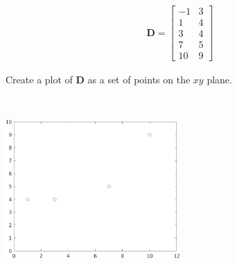 \begin{align*}
    \boldsymbol{D} = \begin{bmatrix}
        -1 & 3 \\
        1 & 4 \\
        3 & 4 \\
        7 & 5 \\
        10 & 9
    \end{bmatrix}
\end{align*}

Create a plot of $\boldsymbol{D}$ as a set of points on the $xy$ plane.

\begin{solution}\
    \begin{center}
        \includegraphics[width=0.5\textwidth]{img/e1p1.png}
    \end{center}
\end{solution}

